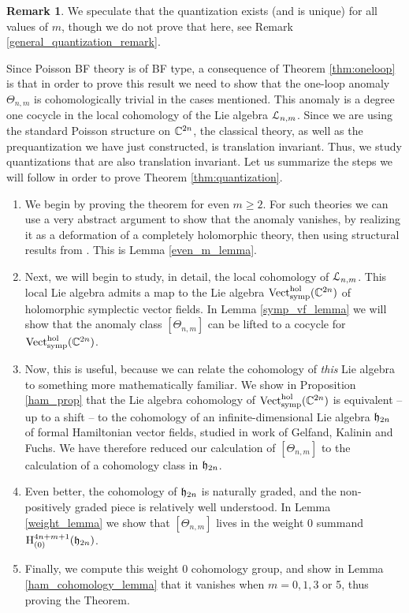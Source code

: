 \documentclass[11pt, oneside, reqno]{amsart}
\theoremstyle{definition} \newtheorem{definition}{Definition}[section]
\theoremstyle{definition}
\theoremstyle{remark}
\theoremstyle{definition} \newtheorem{remark}[definition]{Remark}
\theoremstyle{definition} \newtheorem{remarks}[definition]{Remarks}
\theoremstyle{definition} \newtheorem{question}[definition]{Question}
\theoremstyle{definition} \newtheorem*{note}{Note}
\theoremstyle{definition} \newtheorem{example}[definition]{Example}
\theoremstyle{definition} \newtheorem{examples}[definition]{Examples}
\newcommand{\mr}[1]{\mathrm{#1}}
\begin{document}
\begin{remark}
We speculate that the quantization exists (and is unique) for all values of $m$, though we do not prove that here, see Remark \ref{general_quantization_remark}.
\end{remark}

Since Poisson BF theory is of BF type, a consequence of Theorem \ref{thm:oneloop} is that in order to prove this result we need to show that the one-loop anomaly $\Theta_{n,m}$ is cohomologically trivial in the cases mentioned.  
This anomaly is a degree one cocycle in the local cohomology of the Lie algebra $\mathcal L_{n,m}$.  Since we are using the standard Poisson structure on $\mathbb C^{2n}$, the classical theory, as well as the prequantization we have just constructed, is translation invariant.
Thus, we study quantizations that are also translation invariant.  Let us summarize the steps we will follow in order to prove Theorem \ref{thm:quantization}.
\begin{enumerate}
 \item We begin by proving the theorem for even $m \ge 2$.  For such theories we can use a very abstract argument to show that the anomaly vanishes, by realizing it as a deformation of a completely holomorphic theory, then using structural results from \cite{BWhol}.  This is Lemma \ref{even_m_lemma}.
 \item Next, we will begin to study, in detail, the local cohomology of $\mathcal L_{n,m}$.  This local Lie algebra admits a map to the Lie algebra $\mr{Vect}^{\mr{hol}}_{\mr{symp}}(\CC^{2n})$ of  holomorphic symplectic vector fields.  In Lemma \ref{symp_vf_lemma} we will show that the anomaly class $[\Theta_{n,m}]$ can be lifted to a cocycle for $\mr{Vect}^{\mr{hol}}_{\mr{symp}}(\CC^{2n})$.
 \item Now, this is useful, because we can relate the cohomology of \emph{this} Lie algebra to something more mathematically familiar.  We show in Proposition \ref{ham_prop} that the Lie algebra cohomology of $\mr{Vect}^{\mr{hol}}_{\mr{symp}}(\CC^{2n})$ is equivalent -- up to a shift -- to the cohomology of an infinite-dimensional Lie algebra $\mathfrak h_{2n}$ of formal Hamiltonian vector fields, studied in work of Gelfand, Kalinin and Fuchs.  We have therefore reduced our calculation of $[\Theta_{n,m}]$ to the calculation of a cohomology class in $\mathfrak h_{2n}$.
 \item Even better, the cohomology of $\mathfrak h_{2n}$ is naturally graded, and the non-positively graded piece is relatively well understood.  In Lemma \ref{weight_lemma} we show that $[\Theta_{n,m}]$ lives in the weight 0 summand $\mr H^{4n+m+1}_{(0)}(\fh_{2n})$.
 \item Finally, we compute this weight 0 cohomology group, and show in Lemma \ref{ham_cohomology_lemma} that it vanishes when $m = 0,1,3$ or 5, thus proving the Theorem.
\end{enumerate}
\end{document}
